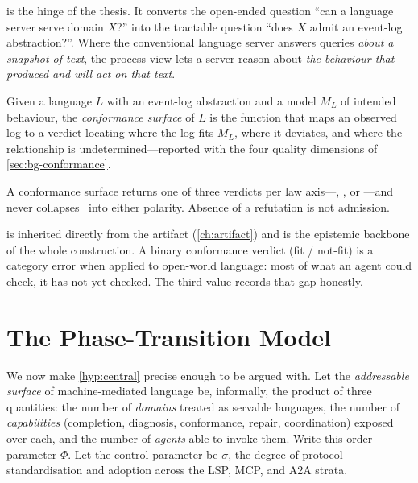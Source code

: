  is the hinge of the thesis. It converts the open-ended
question ``can a language server serve domain $X$?'' into the tractable question
``does $X$ admit an event-log abstraction?''. Where the conventional language
server answers queries \emph{about a snapshot of text}, the process view lets a
server reason about \emph{the behaviour that produced and will act on that text}.

\begin{definition}
\label{def:conformance-surface}
Given a language $L$ with an event-log abstraction and a model $M_L$ of intended
behaviour, the \emph{conformance surface} of $L$ is the function that maps an
observed log to a verdict locating where the log fits $M_L$, where it deviates,
and where the relationship is undetermined---reported with the four quality
dimensions of \cref{sec:bg-conformance}.
\end{definition}

\begin{principle}
\label{prin:three-valued}
A conformance surface returns one of three verdicts per law axis---\admitted,
, or \unknownstat---and never collapses \unknownstat\ into either
polarity. Absence of a refutation is not admission.
\end{principle}

 is inherited directly from the artifact
(\cref{ch:artifact}) and is the epistemic backbone of the whole construction. A
binary conformance verdict (fit / not-fit) is a category error when applied to
open-world language: most of what an agent could check, it has not yet checked.
The third value records that gap honestly.

\section{The Phase-Transition Model}
\label{sec:fw-phase}

We now make \cref{hyp:central} precise enough to be argued with. Let the
\emph{addressable surface} of machine-mediated language be, informally, the
product of three quantities: the number of \emph{domains} treated as servable
languages, the number of \emph{capabilities} (completion, diagnosis, conformance,
repair, coordination) exposed over each, and the number of \emph{agents} able to
invoke them. Write this order parameter $\Phi$. Let the control parameter be
$\sigma$, the degree of protocol standardisation and adoption across the LSP,
MCP, and A2A strata.

